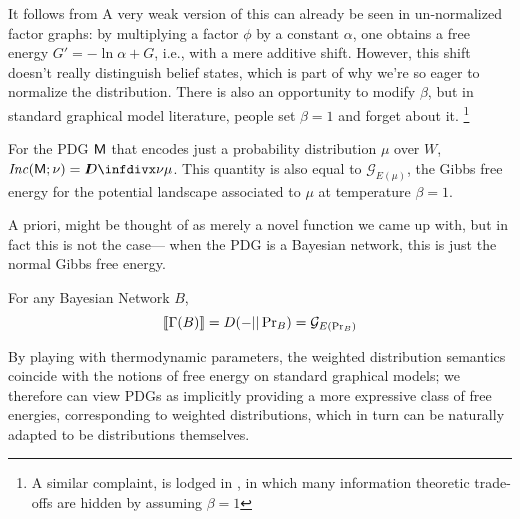\documentclass{article}
\newcommand{\sfM}{\mathsf M}
\newcommand\inconsist{\mathit{Inc}}
\newcommand{\MN}{PDG}
\newcommand{\MNs}{\MN s}
\numberwithin{equation}{section}
\begin{document}
	
	It follows from 
	A very weak version of this can already be seen in un-normalized factor graphs: by multiplying a factor $\phi$ by a constant $\alpha$, one obtains a free energy $G' = - \ln \alpha + G$, i.e., with a mere additive shift. However, this shift doesn't really distinguish belief states, which is part of why we're so eager to normalize the distribution.
	There is also an opportunity to modify $\beta$, but in standard graphical model literature, people set $\beta = 1$ and forget about it.%
		\footnote{A similar complaint, is lodged in \parencite{fixing-broken-elbo}, in which many information theoretic trade-offs are hidden by assuming $\beta = 1$}


	\begin{examplex}[continues=ex:worldsonly]\label{ex:energy-from-distrib}
		For the PDG $\sf M$ that encodes just a probability distribution $\mu$ over $W$,  $\inconsist(\sfM; \nu) = \kldiv{\nu}{\mu}$. This quantity is also equal to $\mathcal G_{E(\mu)}$, the Gibbs free energy for the potential landscape associated to $\mu$ at temperature $\beta = 1$.
	\end{examplex}


	A priori,  might be thought of as merely a novel function we came up with, but in fact this is not the case--- when the PDG is a Bayesian network, this is just the normal Gibbs free energy.

	\begin{prop}\label{prop:bn-free-energy}
		For any Bayesian Network $B$, 
		\[ \llbracket\Gamma(B)\rrbracket = D(- || \Pr\nolimits_B) = \mathcal G_{E(\Pr_B)} \]
	\end{prop}
	
	By playing with thermodynamic parameters, the weighted distribution semantics coincide with the notions of free energy on standard graphical models; we therefore can view PDGs as implicitly providing a more expressive class of free energies, corresponding to weighted distributions, which in turn can be naturally adapted to be distributions themselves.
	


\end{document}
